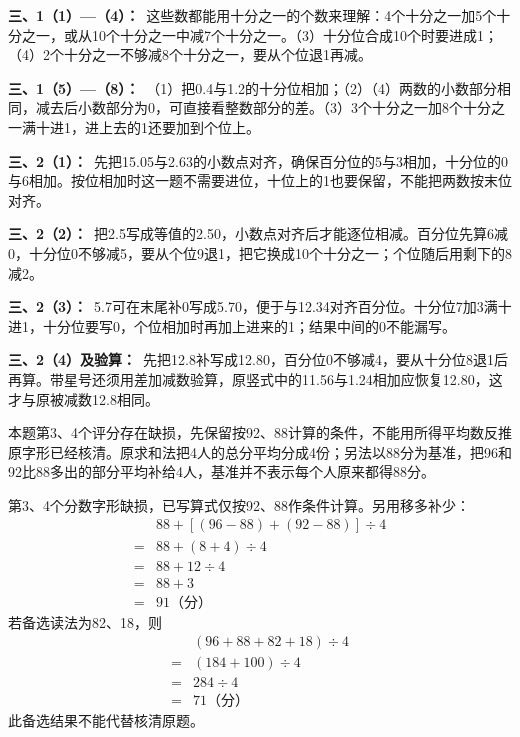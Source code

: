 \documentclass[multi=snippet,border=0pt]{standalone}
\newenvironment{snippet}[3]{\begin{minipage}{#1bp}\color{answerred}\fontsize{#2}{#3}\selectfont\raggedright}{\end{minipage}}
\begin{document}
\begin{snippet}{505}{11.5}{14}\textbf{三、1（1）—（4）：}\ 这些数都能用十分之一的个数来理解：4个十分之一加5个十分之一，或从10个十分之一中减7个十分之一。（3）十分位合成10个时要进成1；（4）2个十分之一不够减8个十分之一，要从个位退1再减。\end{snippet}
\begin{snippet}{505}{11.5}{14}\textbf{三、1（5）—（8）：}\ （1）把0.4与1.2的十分位相加；（2）（4）两数的小数部分相同，减去后小数部分为0，可直接看整数部分的差。（3）3个十分之一加8个十分之一满十进1，进上去的1还要加到个位上。\end{snippet}
\begin{snippet}{505}{11.5}{14}\textbf{三、2（1）：}\ 先把15.05与2.63的小数点对齐，确保百分位的5与3相加，十分位的0与6相加。按位相加时这一题不需要进位，十位上的1也要保留，不能把两数按末位对齐。\end{snippet}
\begin{snippet}{505}{11.5}{14}\textbf{三、2（2）：}\ 把2.5写成等值的2.50，小数点对齐后才能逐位相减。百分位先算6减0，十分位0不够减5，要从个位9退1，把它换成10个十分之一；个位随后用剩下的8减2。\end{snippet}
\begin{snippet}{505}{11.5}{14}\textbf{三、2（3）：}\ 5.7可在末尾补0写成5.70，便于与12.34对齐百分位。十分位7加3满十进1，十分位要写0，个位相加时再加上进来的1；结果中间的0不能漏写。\end{snippet}
\begin{snippet}{505}{11.5}{14}\textbf{三、2（4）及验算：}\ 先把12.8补写成12.80，百分位0不够减4，要从十分位8退1后再算。带星号还须用差加减数验算，原竖式中的11.56与1.24相加应恢复12.80，这才与原被减数12.8相同。\end{snippet}
\begin{snippet}{505}{11.5}{14}本题第3、4个评分存在缺损，先保留按92、88计算的条件，不能用所得平均数反推原字形已经核清。原求和法把4人的总分平均分成4份；另法以88分为基准，把96和92比88多出的部分平均补给4人，基准并不表示每个人原来都得88分。\par 第3、4个分数字形缺损，已写算式仅按92、88作条件计算。另用移多补少：\[\begin{aligned}&88+[(96-88)+(92-88)]\div4\\={}&88+(8+4)\div4\\={}&88+12\div4\\={}&88+3\\={}&91\text{（分）}\end{aligned}\]若备选读法为82、18，则\[\begin{aligned}&(96+88+82+18)\div4\\={}&(184+100)\div4\\={}&284\div4\\={}&71\text{（分）}\end{aligned}\]此备选结果不能代替核清原题。\end{snippet}
\end{document}
